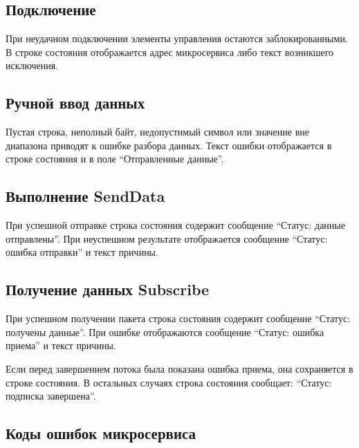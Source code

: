 \subsection{Подключение}

При неудачном подключении элементы управления остаются заблокированными. В
строке состояния отображается адрес микросервиса либо текст возникшего
исключения.

\subsection{Ручной ввод данных}

Пустая строка, неполный байт, недопустимый символ или значение вне диапазона
приводят к ошибке разбора данных. Текст ошибки отображается в строке состояния
и в поле ``Отправленные данные''.

\subsection{Выполнение SendData}

При успешной отправке строка состояния содержит сообщение
``Статус: данные отправлены''. При неуспешном результате отображается сообщение
``Статус: ошибка отправки'' и текст причины.

\subsection{Получение данных Subscribe}

При успешном получении пакета строка состояния содержит сообщение
``Статус: получены данные''. При ошибке отображаются сообщение
``Статус: ошибка приема'' и текст причины.

Если перед завершением потока была показана ошибка приема, она сохраняется в
строке состояния. В остальных случаях строка состояния сообщает:
``Статус: подписка завершена''.

\subsection{Коды ошибок микросервиса}

